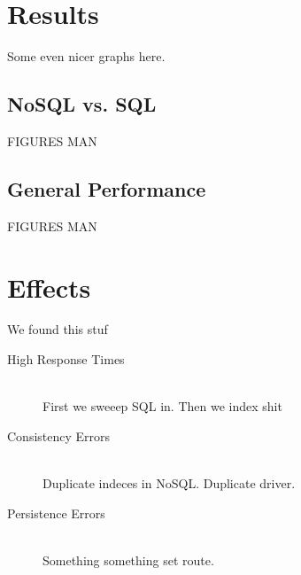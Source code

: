 \section{Results}
Some even nicer graphs here.

\subsection{NoSQL vs. SQL}
FIGURES MAN

\subsection{General Performance}
FIGURES MAN

\section{Effects}
We found this stuf
\begin{description}
    \item[High Response Times]\hfill \\
        First we sweeep SQL in. Then we index shit
    \item[Consistency Errors]\hfill \\
        Duplicate indeces in NoSQL. Duplicate driver.
    \item[Persistence Errors]\hfill \\
        Something something set route.
\end{description}
